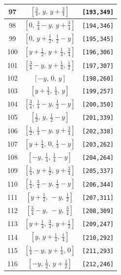 \documentclass[fleqn,8pt]{jsarticle}
\begin{document}
\begin{longtable}{ccc}
97 & $\left[ \frac{3}{4},\, y,\, y + \frac{3}{4} \right]$ & {\tt [193,349]} \\ \hline
98 & $\left[ 0,\, \frac{3}{4} - y,\, y + \frac{3}{4} \right]$ & {\tt [194,346]} \\ \hline
99 & $\left[ 0,\, y + \frac{1}{2},\, \frac{1}{2} - y \right]$ & {\tt [195,345]} \\ \hline
100 & $\left[ y + \frac{1}{2},\, y + \frac{1}{4},\, \frac{3}{4} \right]$ & {\tt [196,306]} \\ \hline
101 & $\left[ \frac{3}{4} - y,\, y + \frac{1}{4},\, \frac{1}{2} \right]$ & {\tt [197,307]} \\ \hline
102 & $\left[ - y,\, 0,\, y \right]$ & {\tt [198,260]} \\ \hline
103 & $\left[ y + \frac{1}{4},\, \frac{1}{4},\, y \right]$ & {\tt [199,257]} \\ \hline
104 & $\left[ \frac{3}{4},\, \frac{1}{4} - y,\, \frac{1}{2} - y \right]$ & {\tt [200,350]} \\ \hline
105 & $\left[ \frac{1}{2},\, y,\, \frac{1}{2} - y \right]$ & {\tt [201,339]} \\ \hline
106 & $\left[ \frac{1}{2},\, \frac{1}{4} - y,\, y + \frac{3}{4} \right]$ & {\tt [202,338]} \\ \hline
107 & $\left[ y + \frac{1}{4},\, 0,\, \frac{1}{4} - y \right]$ & {\tt [203,262]} \\ \hline
108 & $\left[ - y,\, \frac{1}{4},\, \frac{1}{4} - y \right]$ & {\tt [204,264]} \\ \hline
109 & $\left[ \frac{1}{4},\, y + \frac{1}{2},\, y + \frac{3}{4} \right]$ & {\tt [205,337]} \\ \hline
110 & $\left[ \frac{1}{4},\, \frac{3}{4} - y,\, \frac{1}{2} - y \right]$ & {\tt [206,344]} \\ \hline
111 & $\left[ y + \frac{1}{2},\, - y,\, \frac{1}{2} \right]$ & {\tt [207,311]} \\ \hline
112 & $\left[ \frac{3}{4} - y,\, - y,\, \frac{3}{4} \right]$ & {\tt [208,309]} \\ \hline
113 & $\left[ y + \frac{1}{4},\, \frac{3}{4},\, y + \frac{1}{2} \right]$ & {\tt [209,247]} \\ \hline
114 & $\left[ y,\, y + \frac{1}{4},\, \frac{1}{4} \right]$ & {\tt [210,292]} \\ \hline
115 & $\left[ \frac{1}{4} - y,\, y + \frac{1}{4},\, 0 \right]$ & {\tt [211,293]} \\ \hline
116 & $\left[ - y,\, \frac{1}{2},\, y + \frac{1}{2} \right]$ & {\tt [212,246]} \\ \hline

\end{longtable}
\end{document}
